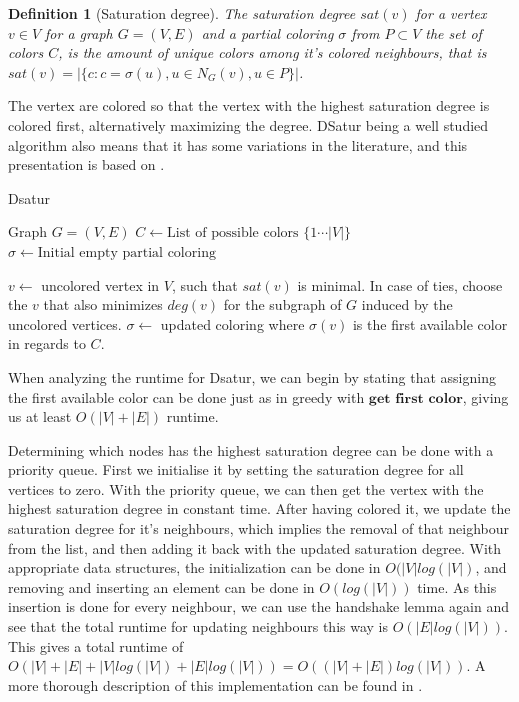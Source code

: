 \documentclass[a4paper]{article}
\newtheorem{definition}{Definition}[section]
\begin{document}
\begin{definition}[Saturation degree]{\cite{Constructive}}
    The saturation degree $sat(v)$ for a vertex $v \in V$ for a graph $G =
    (V,E)$ and a partial coloring $\sigma$ from $P \subset V$ the set of colors $C$, is the amount of unique colors among
    it's colored neighbours, that is $sat(v) = |\{c  : c = \sigma(u), u \in N_G(v),u \in P  \}|$.
\end{definition}

The vertex are colored so that the vertex with the highest saturation degree is
colored first, alternatively maximizing the degree.  DSatur being a well studied
algorithm also means that it has some variations in the literature, and this
presentation is based on \cite{Constructive}.

\begin{algorithm}[H]
  \caption{Dsatur}
  \begin{algorithmic}[1]
      \REQUIRE Graph $G = (V,E)$
      \STATE $C \leftarrow \text{List of possible colors $\{1 \cdots |V| \}$ }$
      \STATE $\sigma \leftarrow \text{Initial empty partial coloring}$


        \STATE $v \leftarrow$ uncolored vertex in $V$, such that $sat(v)$ is
        minimal. In case of ties, choose the $v$ that also minimizes $deg(v)$
        for the subgraph of $G$ induced by the uncolored vertices.
        \STATE $\sigma \leftarrow$ updated coloring where $\sigma(v)$ is the first
        available color in regards to $C$.
      \ENDFOR
  \end{algorithmic}
\end{algorithm}

When analyzing the runtime for Dsatur, we can begin by stating that
assigning the first available color can be done just as in greedy with
$\textbf{get first color}$, giving us at least $O(|V|+|E|)$ runtime. 

Determining which nodes has the highest saturation degree can be done with a
priority queue.  First we initialise it by setting the saturation degree for all
vertices to zero. With the priority queue, we can then get the vertex with the
highest saturation degree in constant time. After having colored it, we update
the saturation degree for it's neighbours, which implies the removal of that
neighbour from the list, and then adding it back with the updated saturation
degree. With appropriate data structures, the initialization can be done in
$O(|V|log(|V|)$, and removing and inserting an element can be done in $O(log(|V|))$
time. As this insertion is done for every neighbour, we can use the handshake
lemma again and see that the total runtime for updating neighbours this way is
$O(|E|log(|V|))$. This gives a total runtime of $O(|V|+|E|+|V|log(|V|)+|E|log(|V|))
= O( (|V|+|E|)log(|V|))$. A more thorough description of this implementation can
be found in \cite{Constructive}.
\end{document}
